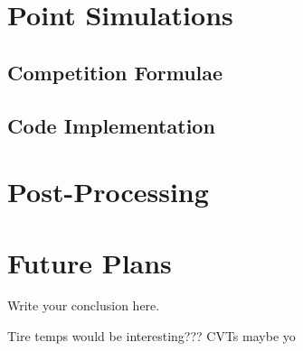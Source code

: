 \documentclass{article}
\begin{document}
\section{Point Simulations}

\subsection{Competition Formulae}

\subsection{Code Implementation}

\section{Post-Processing}

\section{Future Plans}
Write your conclusion here.

Tire temps would be interesting???
CVTs maybe yo
\end{document}
